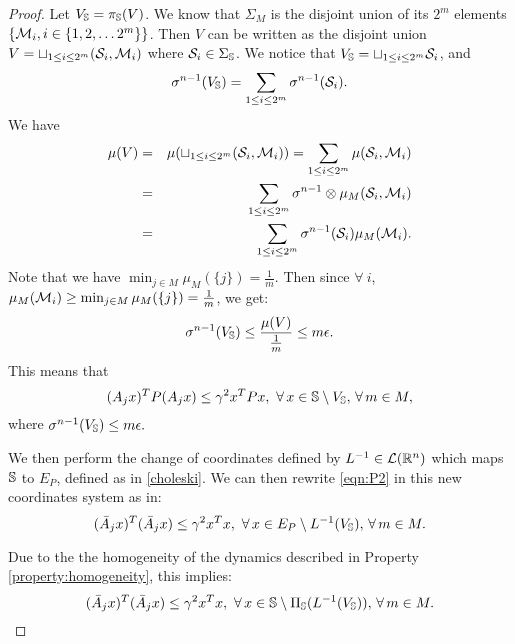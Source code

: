 \begin{proof}
Let $V_{\mathbb{S}} = \pi_{\mathbb{S}}(V)$. We know that $\Sigma_M$ is the disjoint union of its $2^m$ elements $\{\mathcal{M}_i, i \in \{1,2, \ldots 2^m\} \}$. Then $V$ can be written as the disjoint union $V = \sqcup_{1 \leq i \leq 2^m} (\mathcal{S}_i, \mathcal{M}_i)$ where $\mathcal{S}_i \in \Sigma_{\mathbb{S}}$. We notice that 
$V_{\mathbb{S}} = \sqcup_{1 \leq i \leq 2^m} \mathcal{S}_i$, 
and
\begin{equation*}
\sigma^{n-1} (V_{\mathbb{S}}) = \sum_{1 \leq i \leq 2^m} \sigma^{n-1} (\mathcal{S}_i).
\end{equation*}
We have 
\begin{eqnarray*}
\mu(V) &=& \mu(\sqcup_{1 \leq i \leq 2^m} (\mathcal{S}_i, \mathcal{M}_i)) = \sum_{1 \leq i \leq 2^m} \mu(\mathcal{S}_i, \mathcal{M}_i) \\
 &=& \sum_{1 \leq i \leq 2^m} \sigma^{n-1} \otimes \mu_M (\mathcal{S}_i, \mathcal{M}_i) \\
 & = &\sum_{1 \leq i \leq 2^m} \sigma^{n-1}(\mathcal{S}_i) \mu_M (\mathcal{M}_i).
\end{eqnarray*}
Note that we have $\min_{j \in M} \mu_M(\{j\}) = \frac{1}{m}.$ Then since $ \forall \ i$, $\mu_M(\mathcal{M}_i) \geq \min_{j \in M} \mu_M(\{j\}) = \frac{1}{m}$, we get:
\begin{equation}
\sigma^{n-1}(V_{\mathbb{S}}) \leq \frac{\mu(V)}{\frac{1}{m}} \leq m \epsilon.
\end{equation}
This means that 
\begin{equation}\label{eqn:P2}(A_j x)^TP(A_j x) \leq {\gamma}^2x^TPx,\,\, \forall\, x \in \mathbb{S} \setminus V_{\mathbb{S}}, \,\forall\, m \in M,\end{equation}
where $\sigma^{n-1}(V_{\mathbb{S}}) \leq m \epsilon.$

We then perform the change of coordinates defined by $L^{-1} \in \mathcal{L}(\mathbb{R}^n)$ which maps $\mathbb{S}$ to $E_P$, defined as in \eqref{choleski}. We can then rewrite
\eqref{eqn:P2} in this new coordinates system as in: 
\begin{equation}(\bar{A}_j x)^T(\bar{A}_j x) \leq {\gamma}^2x^Tx,\,\, \forall\, x \in E_P\setminus L^{-1}(V_{\mathbb{S}}), \,\forall\, m \in M.\end{equation}

Due to the  the homogeneity of the dynamics described in Property \ref{property:homogeneity}, this implies:
\begin{equation}\label{eqn:P}(\bar{A}_j x)^T(\bar{A}_j x) \leq {\gamma}^2x^Tx,\,\, \forall\, x \in \mathbb{S}\setminus \Pi_{\mathbb{S}}(L^{-1}(V_{\mathbb{S}})), \,\forall\, m \in M.\end{equation}


\end{proof}
